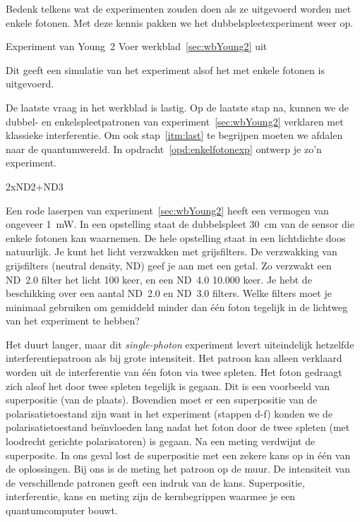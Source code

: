 \documentclass[../../main.tex]{subfiles}
\begin{document}
Bedenk telkens wat de experimenten zouden doen als ze uitgevoerd worden met enkele fotonen. Met deze kennis pakken we het dubbelspleetexperiment weer op. 

\medskip
\begin{experiment}{Experiment van Young~2}%
Voer werkblad~\ref{sec:wbYoung2} uit 
\end{experiment}
Dit  geeft een simulatie van het experiment alsof het met enkele fotonen is uitgevoerd.

De laatste vraag in het werkblad is lastig. Op de laatste stap na, kunnen we de dubbel- en enkelspleetpatronen van experiment~\ref{sec:wbYoung2} verklaren met klassieke interferentie. Om ook stap~\ref{itm:last} te begrijpen moeten we afdalen naar de quantumwereld. In opdracht~\ref{opd:enkelfotonexp} ontwerp je zo'n experiment. 

\medskip
\begin{antwoord}
2xND2+ND3
\end{antwoord}
\begin{opdracht}\label{opd:enkelfotonexp}
Een rode laserpen van experiment~\ref{sec:wbYoung2} heeft een vermogen van ongeveer \SI{1}{\milli\watt}. In een opstelling staat de dubbelspleet \SI{30}{cm} van de sensor die enkele fotonen kan waarnemen. De hele opstelling staat in een lichtdichte doos natuurlijk. Je kunt het licht verzwakken met grijsfilters. De verzwakking van grijsfilters (neutral density, ND) geef je aan met een getal. Zo verzwakt een ND~2.0 filter  het licht \num{100} keer, en een ND~4.0  \num{10.000} keer. Je hebt de beschikking over een aantal ND~2.0 en ND~3.0 filters. Welke filters moet je minimaal gebruiken om gemiddeld minder dan \'e\'en foton tegelijk in de lichtweg van het experiment te hebben?
\end{opdracht}


Het duurt langer, maar dit \textit{single-photon} experiment levert uiteindelijk hetzelfde interferentiepatroon als bij grote intensiteit. Het patroon kan alleen verklaard worden uit de interferentie van \'e\'en foton via twee spleten. Het foton gedraagt zich alsof het door twee spleten tegelijk is gegaan. Dit is een voorbeeld van superpositie (van de plaats). Bovendien moet er een superpositie van de polarisatietoestand zijn want in het experiment (stappen d-f) konden we de polarisatietoestand be\"invloeden lang nadat het foton door de twee spleten (met loodrecht gerichte polarisatoren) is gegaan.  Na een meting verdwijnt de superposite. In ons geval lost de superpositie met een zekere kans op in \'e\'en van de oplossingen. Bij ons is de meting het patroon op de muur. De intensiteit van de verschillende patronen geeft een indruk van de kans. Superpositie, interferentie, kans en meting zijn de kernbegrippen waarmee je een quantumcomputer bouwt.
\end{document}
